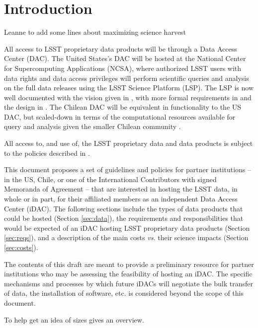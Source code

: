 \section{Introduction}\label{sec:intro}

{\color{red}Leanne to add some lines about maximizing science harvest} \newline

All access to LSST proprietary data products will be through a Data Access Center (DAC). The United States's DAC will be hosted at the National Center for Supercomputing Applications (NCSA), where authorized LSST users with data rights and data access privileges will perform scientific queries and analysis on the full data releases using the LSST Science Platform (LSP). The LSP is now well documented with the vision given in , with more formal requirements in  and the design in . The Chilean DAC will be equivalent in functionality to the US DAC, but scaled-down in terms of the computational resources available for query and analysis given the smaller Chilean community .

All access to, and use of, the LSST proprietary data and data products is subject to the policies described in .

This document proposes a set of guidelines and policies for partner institutions -- in the US, Chile, or one of the International Contributors with signed Memoranda of Agreement -- that are interested in hosting the LSST data, in whole or in part, for their affiliated members as an independent Data Access Center (iDAC). The following sections include the types of data products that could be hosted (Section \ref{sec:data}), the requirements and responsibilities that would be expected of an iDAC hosting LSST proprietary data products (Section \ref{sec:reqs}), and a description of the main costs {\it vs.} their science impacts (Section \ref{sec:costs}).

The contents of this draft are meant to provide a preliminary resource for partner institutions who may be assessing the feasibility of hosting an iDAC. The specific mechanisms and processes by which future iDACs will negotiate the bulk transfer of data, the installation of software, etc. is considered beyond the scope of this document.

To help get an idea of sizes  gives an overview.

